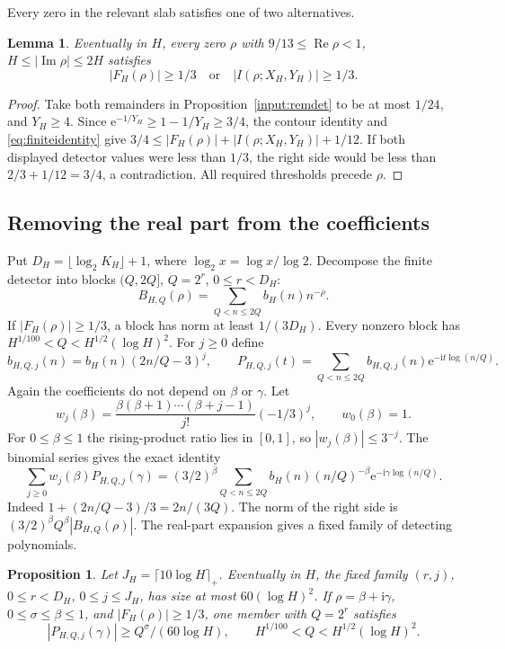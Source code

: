 \documentclass[11pt,a4paper,oneside]{article}
\newtheorem{lemma}[theorem]{Lemma}
\newtheorem{proposition}[theorem]{Proposition}
\theoremstyle{definition}
\newcommand{\ii}{\mathrm i}
\newcommand{\e}{\mathrm e}
\newcommand{\Rea}{\operatorname{Re}}
\newcommand{\Ima}{\operatorname{Im}}
\numberwithin{equation}{section}
\begin{document}
Every zero in the relevant slab satisfies one of two alternatives.
\begin{lemma}\label{lem:alternative}
Eventually in $H$, every zero $\rho$ with
$9/13\le\Rea\rho<1$, $H\le|\Ima\rho|\le2H$ satisfies
\[
 |F_H(\rho)|\ge1/3\quad\text{or}\quad
 |I(\rho;X_H,Y_H)|\ge1/3.
\]
\end{lemma}
\begin{proof}
Take both remainders in Proposition~\ref{input:remdet} to be at most $1/24$,
and $Y_H\ge4$. Since $\e^{-1/Y_H}\ge1-1/Y_H\ge3/4$, the contour
identity and \eqref{eq:finiteidentity} give
$3/4\le|F_H(\rho)|+|I(\rho;X_H,Y_H)|+1/12$.
If both displayed detector values were less than $1/3$, the right side
would be less than $2/3+1/12=3/4$, a contradiction.
All required thresholds precede $\rho$.
\end{proof}
\subsection{Removing the real part from the coefficients}
Put $D_H=\lfloor\log_2 K_H\rfloor+1$, where $\log_2 x=\log x/\log2$. Decompose the finite detector into
blocks $(Q,2Q]$, $Q=2^r$, $0\le r<D_H$:
\[
 B_{H,Q}(\rho)=\sum_{Q<n\le2Q}b_H(n)n^{-\rho}.
\]
If $|F_H(\rho)|\ge1/3$, a block has norm at least $1/(3D_H)$.
Every nonzero block has
$H^{1/100}<Q<H^{1/2}(\log H)^2$.
For $j\ge0$ define
\[
 b_{H,Q,j}(n)=b_H(n)(2n/Q-3)^j,\qquad
 P_{H,Q,j}(t)=\sum_{Q<n\le2Q}b_{H,Q,j}(n)\e^{-\ii t\log(n/Q)}.
\]
Again the coefficients do not depend on $\beta$ or $\gamma$.
Let
\[
 w_j(\beta)=\frac{\beta(\beta+1)\cdots(\beta+j-1)}{j!}(-1/3)^j,
 \qquad w_0(\beta)=1.
\]
For $0\le\beta\le1$ the rising-product ratio lies in $[0,1]$, so
$|w_j(\beta)|\le3^{-j}$. The binomial series gives the exact identity
\[
 \sum_{j\ge0}w_j(\beta)P_{H,Q,j}(\gamma)
       =(3/2)^\beta\sum_{Q<n\le2Q}b_H(n)(n/Q)^{-\beta}
                                    \e^{-\ii\gamma\log(n/Q)}.
\]
Indeed $1+(2n/Q-3)/3=2n/(3Q)$.
The norm of the right side is $(3/2)^\beta Q^\beta|B_{H,Q}(\rho)|$.
The real-part expansion gives a fixed family of detecting polynomials.
\begin{proposition}\label{prop:fixedfamily}
Let $J_H=\lceil10\log H\rceil_+$. Eventually in $H$, the fixed family
$(r,j)$, $0\le r<D_H$, $0\le j\le J_H$, has size at most
$60(\log H)^2$. If $\rho=\beta+\ii\gamma$, $0\le\sigma\le\beta\le1$, and
$|F_H(\rho)|\ge1/3$, one member with $Q=2^r$ satisfies
\[
 |P_{H,Q,j}(\gamma)|\ge Q^\sigma/(60\log H),\qquad
 H^{1/100}<Q<H^{1/2}(\log H)^2.
\]
\end{proposition}
\end{document}
